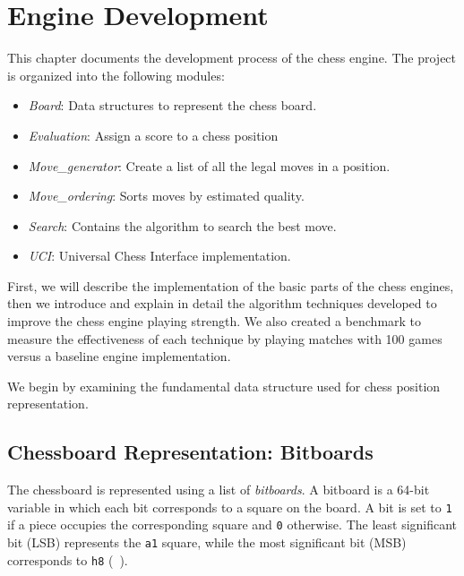 \chapter{Engine Development}
\label{cap:descripcionTrabajo}

This chapter documents the development process of the chess engine. The project is organized into the following modules:

\begin{itemize}
    \item \textit{Board}: Data structures to represent the chess board.
    \item \textit{Evaluation}: Assign a score to a chess position
    \item \textit{Move\_generator}: Create a list of all the legal moves in a position.
    \item \textit{Move\_ordering}: Sorts moves by estimated quality.
    \item \textit{Search}: Contains the algorithm to search the best move.
    \item \textit{UCI}: Universal Chess Interface implementation.
\end{itemize}

\noindent First, we will describe the implementation of the basic parts of the chess engines, then we introduce and explain in detail the algorithm techniques developed to improve the chess engine playing strength. We also created a benchmark to measure the effectiveness of each technique by playing matches with 100 games versus a baseline engine implementation.

\vspace{1em}

\noindent We begin by examining the fundamental data structure used for chess position representation.

\section{Chessboard Representation: Bitboards}

\noindent The chessboard is represented using a list of \textit{bitboards}. A bitboard is a 64-bit variable in which each bit corresponds to a square on the board. A bit is set to \texttt{1} if a piece occupies the corresponding square and \texttt{0} otherwise. The least significant bit (LSB) represents the \texttt{a1} square, while the most significant bit (MSB) corresponds to \texttt{h8} (~\cite{Bitboards}).
 
\vspace{1em}

